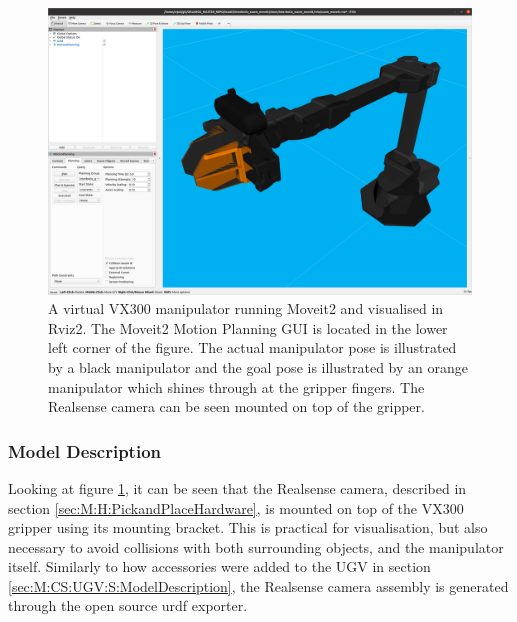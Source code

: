 \begin{figure}[htp]
  \centering
  \includegraphics[width = 1\textwidth]{Figures/figVX300Moveit.png}
  \caption{A virtual VX300 manipulator running Moveit2 and visualised in Rviz2. The Moveit2 Motion Planning GUI is located in the lower left corner of the figure. The actual manipulator pose is illustrated by a black manipulator and the goal pose is illustrated by an orange manipulator which shines through at the gripper fingers. The Realsense camera can be seen mounted on top of the gripper.}
  \label{fig:VX300Moveit}
\end{figure}

\subsubsection{Model Description}
Looking at figure \ref{fig:VX300Moveit}, it can be seen that the Realsense camera, described in section \ref{sec:M:H:PickandPlaceHardware}, is mounted on top of the VX300 gripper using its mounting bracket. This is practical for visualisation, but also necessary to avoid collisions with both surrounding objects, and the manipulator itself. Similarly to how accessories were added to the UGV in section \ref{sec:M:CS:UGV:S:ModelDescription}, the Realsense camera assembly is generated through the open source urdf exporter\cite{urdf_exporter}. 

